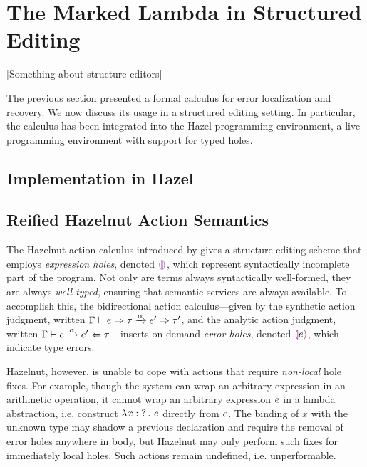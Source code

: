 \section{The Marked Lambda in Structured Editing}
\label{sec:calculus-structured-editing}

[Something about structure editors]

The previous section presented a formal calculus for error localization and recovery. We now discuss
its usage in a structured editing setting. In particular, the calculus has been integrated into the
Hazel programming environment, a live programming environment with support for typed holes.

\subsection{Implementation in Hazel}
\label{sec:calculus-hazel}

\subsection{Reified Hazelnut Action Semantics}
\label{sec:calculus-hazelnut}

The Hazelnut action calculus introduced by \citet{HazelnutPOPL} gives a structure editing scheme
that employs \emph{expression holes}, denoted $\EEHole$, which represent syntactically incomplete
part of the program. Not only are terms always syntactically well-formed, they are always
\emph{well-typed}, ensuring that semantic services are always available. To accomplish this, the
bidirectional action calculus---given by the synthetic action judgment, written
$\Gamma \vdash e \Rightarrow \tau \xrightarrow{\alpha} e' \Rightarrow \tau'$, and the analytic action judgment, written
$\Gamma \vdash e \xrightarrow{\alpha} e' \Leftarrow \tau$---inserts on-demand \emph{error holes}, denoted
$\textcolor{violet}{\llparenthesis} e \textcolor{violet}{\rrparenthesis}$, which indicate type errors.


Hazelnut, however, is unable to cope with actions that require \emph{non-local} hole fixes. For
example, though the system can wrap an arbitrary expression in an arithmetic operation, it cannot
wrap an arbitrary expression $e$ in a lambda abstraction, i.e. construct
$\lambda x : \operatorname{?}. ~e$ directly from $e$. The binding of $x$ with the unknown type may
shadow a previous declaration and require the removal of error holes anywhere in body, but Hazelnut
may only perform such fixes for immediately local holes. Such actions remain undefined, i.e.
unperformable.

